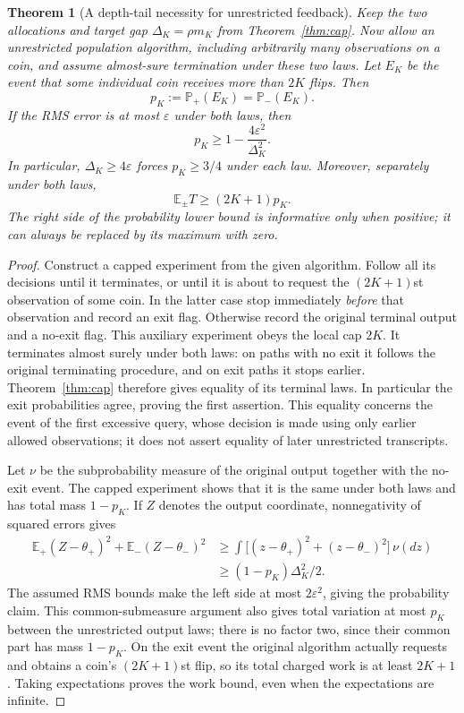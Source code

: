 \documentclass[11pt]{article}
\newtheorem{theorem}{Theorem}
\begin{document}
\begin{theorem}[A depth-tail necessity for unrestricted feedback]\label{thm:tail}
Keep the two allocations and target gap $\Delta_K=\rho m_K$ from
Theorem~\ref{thm:cap}. Now allow an unrestricted population algorithm,
including arbitrarily many observations on a coin, and assume almost-sure
termination under these two laws. Let $E_K$ be the event that some individual
coin receives more than $2K$ flips. Then
\[
 p_K:=\mathbb P_+(E_K)=\mathbb P_-(E_K).
\]
If the RMS error is at most $\varepsilon$ under both laws, then
\[
 p_K\ge 1-\frac{4\varepsilon^2}{\Delta_K^2}.
\]
In particular, $\Delta_K\ge4\varepsilon$ forces $p_K\ge3/4$ under each law.
Moreover, separately under both laws,
\[
 \mathbb E_\pm T\ge(2K+1)p_K.
\]
The right side of the probability lower bound is informative only when
positive; it can always be replaced by its maximum with zero.
\end{theorem}
\begin{proof}
Construct a capped experiment from the given algorithm. Follow all its
decisions until it terminates, or until it is about to request the
$(2K+1)$st observation of some coin. In the latter case stop immediately
\emph{before} that observation and record an exit flag. Otherwise record
the original terminal output and a no-exit flag. This auxiliary experiment
obeys the local cap $2K$. It terminates almost surely under both laws: on
paths with no exit it follows the original terminating procedure, and on
exit paths it stops earlier. Theorem~\ref{thm:cap} therefore gives equality
of its terminal laws. In particular the exit probabilities agree, proving
the first assertion. This equality concerns the event of the first excessive
query, whose decision is made using only earlier allowed observations; it
does not assert equality of later unrestricted transcripts.

Let $\nu$ be the subprobability measure of the original output together with
the no-exit event. The capped experiment shows that it is the same under
both laws and has total mass $1-p_K$. If $Z$ denotes the output coordinate,
nonnegativity of squared errors gives
\begin{align*}
 \mathbb E_+(Z-\theta_+)^2+\mathbb E_-(Z-\theta_-)^2
 &\ge\int\bigl[(z-\theta_+)^2+(z-\theta_-)^2\bigr]\,\nu(dz)\\
 &\ge (1-p_K)\Delta_K^2/2.
\end{align*}
The assumed RMS bounds make the left side at most $2\varepsilon^2$, giving
the probability claim. This common-submeasure argument also gives total
variation at most $p_K$ between the unrestricted output laws; there is no
factor two, since their common part has mass $1-p_K$.
On the exit event the original algorithm actually requests and obtains a
coin's $(2K+1)$st flip, so its total charged work is at least $2K+1$.
Taking expectations proves the work bound, even when the expectations are
infinite.
\end{proof}
\end{document}

